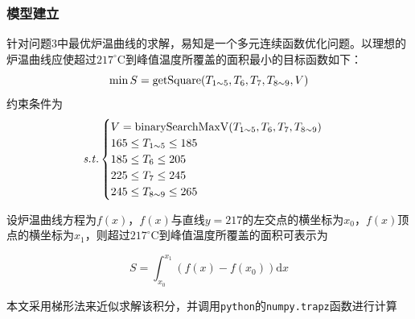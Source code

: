 \documentclass[../main.tex]{subfiles}
\begin{document}
\subsubsection{模型建立}
针对问题3中最优炉温曲线的求解，易知是一个多元连续函数优化问题。以理想的炉温曲线应使超过\(217 ^{\circ}\mathrm{C}\)到峰值温度所覆盖的面积最小的目标函数如下：
\begin{equation}
\min S = \mathrm{getSquare} (T _{1 {\sim} 5},T _{6} , T _{7} , T _{8 {\sim} 9}, V) \\
\end{equation}
约束条件为
\begin{equation}{\it s.t.}
	\begin{cases}
		V = \mathrm{binarySearchMaxV} (T _{1{\sim} 5}, T_{6} , T _{7},T_{8{\sim} 9})\\
		165 \le T_{1 {\sim} 5} \le 185\\
		185 \le T _{6} \le 205 \\
		225 \le T _{7} \le 245 \\
		245 \le T _{8 {\sim} 9} \le 265
	\end{cases}
\end{equation}

设炉温曲线方程为$f(x)$，$f(x)$与直线$y=217$的左交点的横坐标为$x_0$，$f(x)$顶点的横坐标为$x_1$，则超过$217^{\circ}\mathrm{C}$到峰值温度所覆盖的面积可表示为

\begin{equation}
S = \int _{x_0} ^{x_1} {(f(x)-f(x_0)) \mathrm{d} x}
\end{equation}

本文采用梯形法来近似求解该积分，并调用\texttt{python}的\texttt{numpy.trapz}函数进行计算
\end{document}
